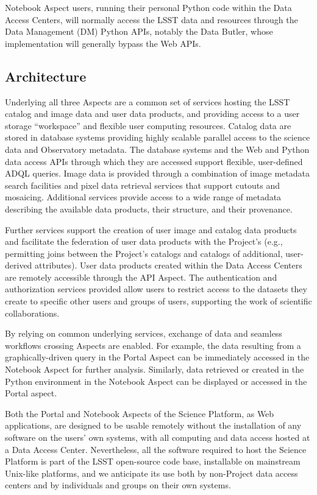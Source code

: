 Notebook Aspect users, running their personal Python code within the Data Access Centers, will normally access the LSST data and resources through the Data Management (DM) Python APIs, notably the Data Butler, whose implementation will generally bypass the Web APIs.

\subsection{Architecture}\label{architecture-intro}

Underlying all three Aspects are a common set of services hosting the LSST catalog and image data and user data products, and providing access to a user storage ``workspace'' and flexible user computing resources.
Catalog data are stored in database systems providing highly scalable parallel access to the science data and Observatory metadata.
The database systems and the Web and Python data access APIs through which they are accessed support flexible, user-defined ADQL queries.
Image data is provided through a combination of image metadata search facilities and pixel data retrieval services that support cutouts and mosaicing.
Additional services provide access to a wide range of metadata describing the available data products, their structure, and their provenance.

Further services support the creation of user image and catalog data products and facilitate the federation of user data products with the Project's
(e.g., permitting joins between the Project's catalogs and catalogs of additional, user-derived attributes).
User data products created within the Data Access Centers are remotely accessible through the API Aspect.
The authentication and authorization services provided allow users to restrict access to the datasets they create to specific other users and groups of users, supporting the work of scientific collaborations.

By relying on common underlying services, exchange of data and seamless workflows crossing Aspects are enabled.
For example, the data resulting from a graphically-driven query in the Portal Aspect can be immediately accessed in the Notebook Aspect for further analysis.
Similarly, data retrieved or created in the Python environment in the Notebook Aspect can be displayed or accessed in the Portal aspect.

Both the Portal and Notebook Aspects of the Science Platform, as Web applications, are designed to be usable remotely without the installation of any software on the users' own systems, with all computing and data access hosted at a Data Access Center.
Nevertheless, all the software required to host the Science Platform is part of the LSST open-source code base, installable on mainstream Unix-like platforms, and we anticipate its use both by non-Project data access centers and by individuals and groups on their own systems.
